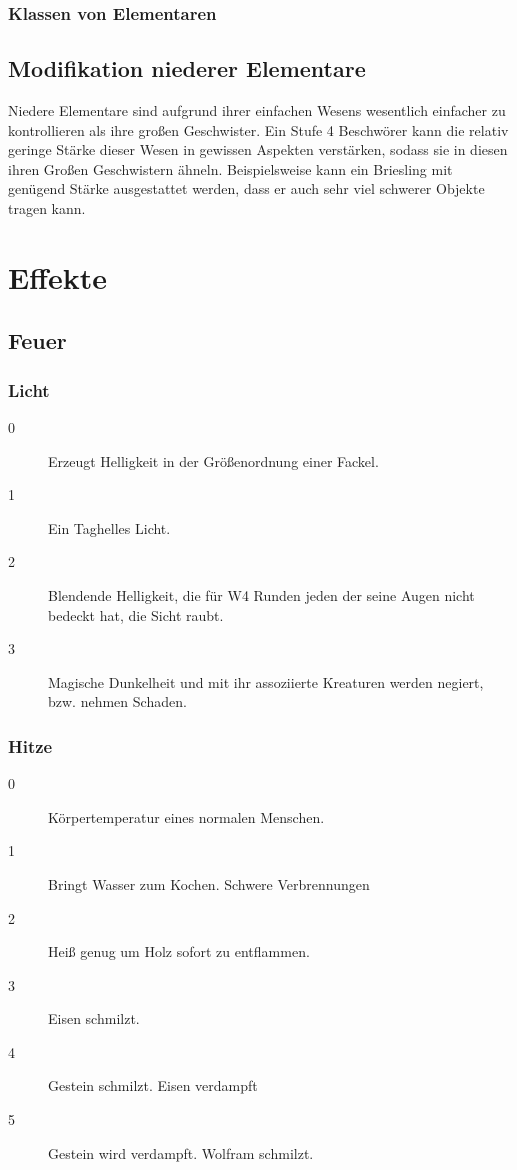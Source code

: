 \documentclass[a4paper,12pt,oneside]{book}
\begin{document}
\section{Klassen von Elementaren}


\chapter{Modifikation niederer Elementare}
Niedere Elementare sind aufgrund ihrer einfachen Wesens wesentlich einfacher zu kontrollieren als ihre großen Geschwister. Ein Stufe 4 Beschwörer kann die relativ geringe Stärke dieser Wesen in gewissen Aspekten verstärken, sodass sie in diesen ihren Großen Geschwistern ähneln. Beispielsweise kann ein Briesling mit genügend Stärke ausgestattet werden, dass er auch sehr viel schwerer Objekte tragen kann.

\part{Effekte}

\chapter{Feuer}
\section{Licht}
\begin{description}
\item[0] Erzeugt Helligkeit in der Größenordnung einer Fackel.
\item[1] Ein Taghelles Licht.
\item[2] Blendende Helligkeit, die für W4 Runden jeden der seine Augen nicht bedeckt hat, die Sicht raubt.
\item[3] Magische Dunkelheit und mit ihr assoziierte Kreaturen werden negiert, bzw. nehmen Schaden.     
\end{description}
\section{Hitze}
\begin{description}
\item[0] Körpertemperatur eines normalen Menschen.
\item[1] Bringt Wasser zum Kochen. Schwere Verbrennungen
\item[2] Heiß genug um Holz sofort zu entflammen.
\item[3] Eisen schmilzt.
\item[4] Gestein schmilzt. Eisen verdampft
\item[5] Gestein wird verdampft. Wolfram schmilzt.
\end{description}
\end{document}
